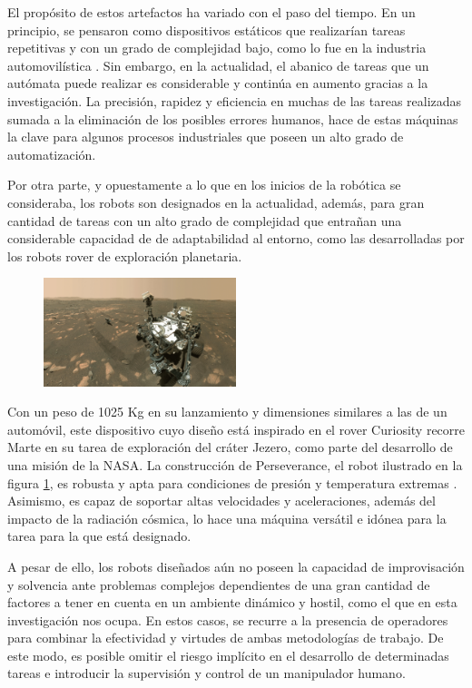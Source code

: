 El propósito de estos artefactos ha variado con el paso del tiempo. En un principio, se pensaron como dispositivos estáticos que realizarían tareas repetitivas y con un grado de complejidad bajo, como lo fue en la industria automovilística \cite{1}.  Sin embargo, en la actualidad, el abanico de tareas que un autómata puede realizar es considerable y continúa en aumento gracias a la investigación. La precisión, rapidez y eficiencia en muchas de las tareas realizadas sumada a la eliminación de los posibles errores humanos, hace de estas máquinas la clave para algunos procesos industriales que poseen un alto grado de automatización.

Por otra parte, y opuestamente a lo que en los inicios de la robótica se consideraba, los robots son designados en la actualidad, además, para gran cantidad de tareas con un alto grado de complejidad que entrañan una considerable capacidad de  de adaptabilidad al entorno, como las desarrolladas por los robots rover de exploración planetaria.


\begin{figure}[hbt]
    \centering
    \includegraphics[width=0.5\textwidth]{imagenes/Perseverance.jpg}
    \caption{\cite{83}}
    \label{fig:perseverance}
\end{figure}

Con un peso de 1025 Kg en su lanzamiento y dimensiones similares a las de un automóvil, este dispositivo cuyo diseño está inspirado en el rover Curiosity recorre Marte en su tarea de exploración del cráter Jezero, como parte del desarrollo de una misión de la NASA. La construcción de Perseverance, el robot ilustrado en la figura \ref{fig:perseverance}, es robusta y apta para condiciones de presión y temperatura extremas \cite{2}. Asimismo, es capaz de soportar altas velocidades y aceleraciones, además del impacto de la radiación cósmica, lo hace una máquina versátil e idónea para la tarea para la que está designado.

A pesar de ello, los robots diseñados aún no poseen la capacidad de improvisación y solvencia ante problemas complejos dependientes de una gran cantidad de factores a tener en cuenta en un ambiente dinámico y hostil, como el que en esta investigación nos ocupa. En estos casos, se recurre a la presencia de  operadores para combinar la efectividad y virtudes de ambas metodologías de trabajo. De este modo, es posible omitir el riesgo implícito en el desarrollo de determinadas tareas e introducir la supervisión y control de un manipulador humano.

